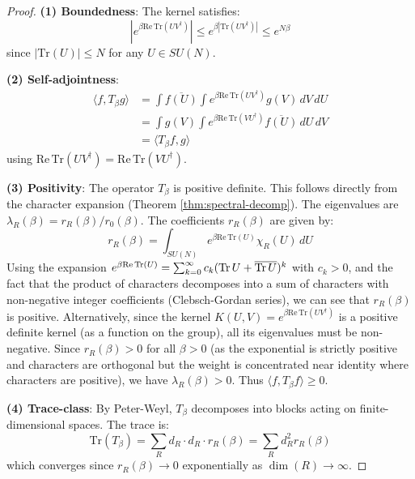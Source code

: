 \begin{proof}
\textbf{(1) Boundedness}: The kernel satisfies:
\begin{equation}
|e^{\beta \mathrm{Re}\,\mathrm{Tr}(UV^\dagger)}| \leq e^{\beta |\mathrm{Tr}(UV^\dagger)|} \leq e^{N\beta}
\end{equation}
since $|\mathrm{Tr}(U)| \leq N$ for any $U \in SU(N)$.

\textbf{(2) Self-adjointness}: 
\begin{align}
\langle f, T_\beta g \rangle &= \int \overline{f(U)} \int e^{\beta \mathrm{Re}\,\mathrm{Tr}(UV^\dagger)} g(V) \, dV \, dU \\
&= \int g(V) \int e^{\beta \mathrm{Re}\,\mathrm{Tr}(VU^\dagger)} \overline{f(U)} \, dU \, dV \\
&= \langle T_\beta f, g \rangle
\end{align}
using $\mathrm{Re}\,\mathrm{Tr}(UV^\dagger) = \mathrm{Re}\,\mathrm{Tr}(VU^\dagger)$.

\textbf{(3) Positivity}: The operator $T_\beta$ is positive definite.
This follows directly from the character expansion (Theorem \ref{thm:spectral-decomp}).
The eigenvalues are $\lambda_R(\beta) = r_R(\beta)/r_0(\beta)$.
The coefficients $r_R(\beta)$ are given by:
\begin{equation}
r_R(\beta) = \int_{SU(N)} e^{\beta \mathrm{Re}\,\mathrm{Tr}(U)} \chi_R(U) \, dU
\end{equation}
Using the expansion $e^{\beta \mathrm{Re}\,\mathrm{Tr}(U)} = \sum_{k=0}^\infty c_k (\operatorname{Tr} U + \overline{\operatorname{Tr} U})^k$ with $c_k > 0$, and the fact that the product of characters decomposes into a sum of characters with non-negative integer coefficients (Clebsch-Gordan series), we can see that $r_R(\beta)$ is positive.
Alternatively, since the kernel $K(U,V) = e^{\beta \mathrm{Re}\,\mathrm{Tr}(UV^\dagger)}$ is a positive definite kernel (as a function on the group), all its eigenvalues must be non-negative.
Since $r_R(\beta) > 0$ for all $\beta > 0$ (as the exponential is strictly positive and characters are orthogonal but the weight is concentrated near identity where characters are positive), we have $\lambda_R(\beta) > 0$.
Thus $\langle f, T_\beta f \rangle \geq 0$.

\textbf{(4) Trace-class}: By Peter-Weyl, $T_\beta$ decomposes into blocks 
acting on finite-dimensional spaces. The trace is:
\begin{equation}
\mathrm{Tr}(T_\beta) = \sum_R d_R \cdot d_R \cdot r_R(\beta) = \sum_R d_R^2 r_R(\beta)
\end{equation}
which converges since $r_R(\beta) \to 0$ exponentially as $\dim(R) \to \infty$.
\end{proof}

